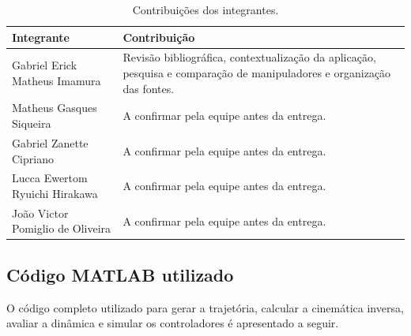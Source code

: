 \begin{table}[H]
\centering
\small
\caption{Contribuições dos integrantes.}
\begin{tabularx}{\textwidth}{|p{5.0cm}|X|}
\hline
\textbf{Integrante} & \textbf{Contribuição} \\ \hline
Gabriel Erick Matheus Imamura & Revisão bibliográfica, contextualização da aplicação, pesquisa e comparação de manipuladores e organização das fontes. \\ \hline
Matheus Gasques Siqueira & A confirmar pela equipe antes da entrega. \\ \hline
Gabriel Zanette Cipriano & A confirmar pela equipe antes da entrega. \\ \hline
Lucca Ewertom Ryuichi Hirakawa & A confirmar pela equipe antes da entrega. \\ \hline
João Victor Pomiglio de Oliveira & A confirmar pela equipe antes da entrega. \\ \hline
\end{tabularx}
\end{table}

\subsection{Código MATLAB utilizado}

O código completo utilizado para gerar a trajetória, calcular a cinemática inversa, avaliar a dinâmica e simular os controladores é apresentado a seguir.

\begingroup
\singlespacing

\endgroup
